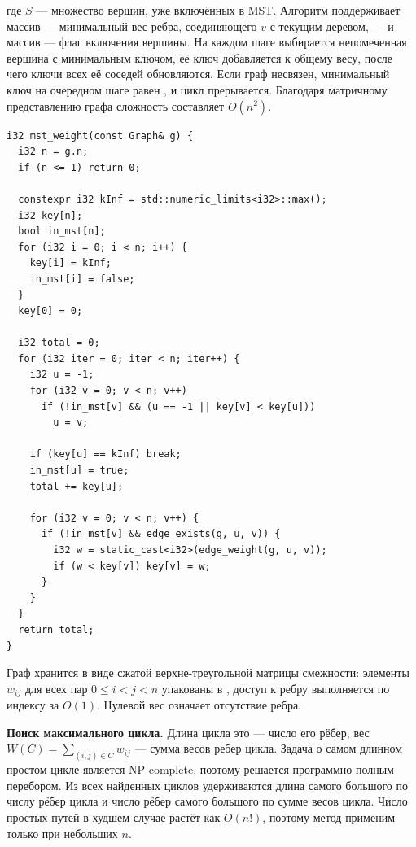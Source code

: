 \documentclass[14pt]{extarticle}
\renewcommand{\texttt}[1]{{\codefont \seqsplit{#1}}}
\begin{document}
где \(S\) --- множество вершин, уже включённых в MST. Алгоритм поддерживает массив \texttt{key[v]} --- минимальный вес ребра, соединяющего \(v\) с текущим деревом, --- и массив \texttt{in\_mst[v]} --- флаг включения вершины. На каждом шаге выбирается непомеченная вершина с минимальным ключом, её ключ добавляется к общему весу, после чего ключи всех её соседей обновляются. Если граф несвязен, минимальный ключ на очередном шаге равен \texttt{kInf}, и цикл прерывается. Благодаря матричному представлению графа сложность составляет \(O(n^2)\).

\begin{listing}[htbp]
\caption{Алгоритм Прима для вычисления веса MST}
\begin{verbatim}
i32 mst_weight(const Graph& g) {
  i32 n = g.n;
  if (n <= 1) return 0;

  constexpr i32 kInf = std::numeric_limits<i32>::max();
  i32 key[n];
  bool in_mst[n];
  for (i32 i = 0; i < n; i++) {
    key[i] = kInf;
    in_mst[i] = false;
  }
  key[0] = 0;

  i32 total = 0;
  for (i32 iter = 0; iter < n; iter++) {
    i32 u = -1;
    for (i32 v = 0; v < n; v++)
      if (!in_mst[v] && (u == -1 || key[v] < key[u]))
        u = v;

    if (key[u] == kInf) break;
    in_mst[u] = true;
    total += key[u];

    for (i32 v = 0; v < n; v++) {
      if (!in_mst[v] && edge_exists(g, u, v)) {
        i32 w = static_cast<i32>(edge_weight(g, u, v));
        if (w < key[v]) key[v] = w;
      }
    }
  }
  return total;
}
\end{verbatim}
\end{listing}

Граф хранится в виде сжатой верхне-треугольной матрицы смежности: элементы \(w_{ij}\) для всех пар \(0 \le i < j < n\) упакованы в \texttt{std::span<u8>}, доступ к ребру выполняется по индексу за \(O(1)\). Нулевой вес означает отсутствие ребра.

\textbf{Поиск максимального цикла.} Длина цикла это --- число его рёбер, вес \(W(C) = \sum_{(i,j) \in C} w_{ij}\) --- сумма весов ребер цикла. Задача о самом длинном простом цикле является NP-complete, поэтому решается программно полным перебором. Из всех найденных циклов удерживаются длина самого большого по числу рёбер цикла и число рёбер самого большого по сумме весов цикла. Число простых путей в худшем случае растёт как \(O(n!)\), поэтому метод применим только при небольших \(n\).
\end{document}
